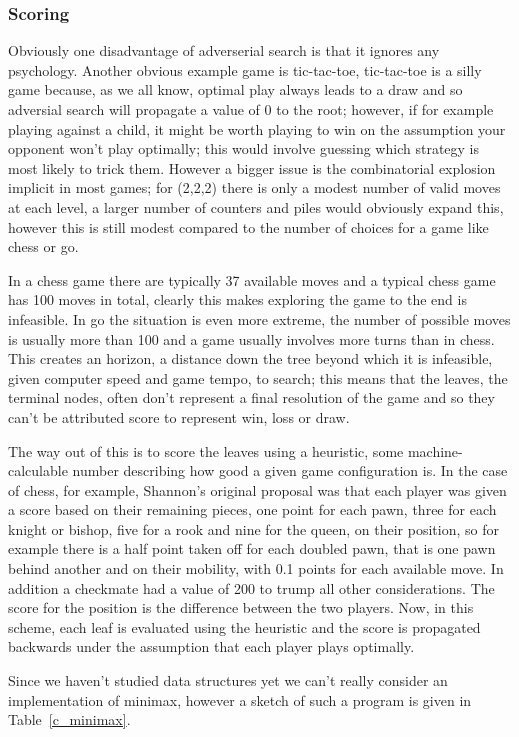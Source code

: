\documentclass[11pt,a4paper]{scrartcl}
\begin{document}
\subsubsection*{Scoring}
Obviously one disadvantage of adverserial search is that it ignores
any psychology. Another obvious example game is tic-tac-toe,
tic-tac-toe is a silly game because, as we all know, optimal play
always leads to a draw and so adversial search will propagate a value
of 0 to the root; however, if for example playing against a child, it
might be worth playing to win on the assumption your opponent won't
play optimally; this would involve guessing which strategy is most
likely to trick them. However a bigger issue is the combinatorial
explosion implicit in most games; for (2,2,2) there is only a modest
number of valid moves at each level, a larger number of counters and
piles would obviously expand this, however this is still modest
compared to the number of choices for a game like chess or go.

In a chess game there are typically 37 available moves and a typical
chess game has 100 moves in total, clearly this makes exploring the
game to the end is infeasible. In go the situation is even more
extreme, the number of possible moves is usually more than 100 and a
game usually involves more turns than in chess. This creates an
horizon, a distance down the tree beyond which it is infeasible, given
computer speed and game tempo, to search; this means that the leaves,
the terminal nodes, often don't represent a final resolution of the
game and so they can't be attributed score to represent win, loss or
draw.

The way out of this is to score the leaves using a heuristic, some
machine-calculable number describing how good a given game
configuration is. In the case of chess, for example, Shannon's
original proposal was that each player was given a score based on
their remaining pieces, one point for each pawn, three for each knight
or bishop, five for a rook and nine for the queen, on their position,
so for example there is a half point taken off for each doubled pawn,
that is one pawn behind another and on their mobility, with 0.1 points
for each available move. In addition a checkmate had a value of 200 to
trump all other considerations. The score for the position is the
difference between the two players. Now, in this scheme, each leaf is
evaluated using the heuristic and the score is propagated backwards
under the assumption that each player plays optimally.

Since we haven't studied data structures yet we can't really consider
an implementation of minimax, however a sketch of such a program is
given in Table~\ref{c_minimax}.
   
\end{document}
